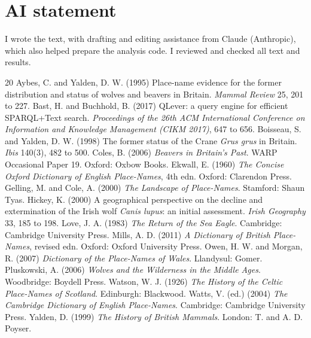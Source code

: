 \documentclass[11pt,a4paper]{article}
\begin{document}
\section*{AI statement}
I wrote the text, with drafting and editing assistance from Claude (Anthropic), which also helped prepare the analysis code. I reviewed and checked all text and results.

\begin{thebibliography}{20}
 Aybes, C. and Yalden, D. W. (1995) Place-name evidence for the former distribution and status of wolves and beavers in Britain. \textit{Mammal Review} 25, 201 to 227.
 Bast, H. and Buchhold, B. (2017) QLever: a query engine for efficient SPARQL+Text search. \textit{Proceedings of the 26th ACM International Conference on Information and Knowledge Management (CIKM 2017)}, 647 to 656.
 Boisseau, S. and Yalden, D. W. (1998) The former status of the Crane \textit{Grus grus} in Britain. \textit{Ibis} 140(3), 482 to 500.
 Coles, B. (2006) \textit{Beavers in Britain's Past}. WARP Occasional Paper 19. Oxford: Oxbow Books.
 Ekwall, E. (1960) \textit{The Concise Oxford Dictionary of English Place-Names}, 4th edn. Oxford: Clarendon Press.
 Gelling, M. and Cole, A. (2000) \textit{The Landscape of Place-Names}. Stamford: Shaun Tyas.
 Hickey, K. (2000) A geographical perspective on the decline and extermination of the Irish wolf \textit{Canis lupus}: an initial assessment. \textit{Irish Geography} 33, 185 to 198.
 Love, J. A. (1983) \textit{The Return of the Sea Eagle}. Cambridge: Cambridge University Press.
 Mills, A. D. (2011) \textit{A Dictionary of British Place-Names}, revised edn. Oxford: Oxford University Press.
 Owen, H. W. and Morgan, R. (2007) \textit{Dictionary of the Place-Names of Wales}. Llandysul: Gomer.
 Pluskowski, A. (2006) \textit{Wolves and the Wilderness in the Middle Ages}. Woodbridge: Boydell Press.
 Watson, W. J. (1926) \textit{The History of the Celtic Place-Names of Scotland}. Edinburgh: Blackwood.
 Watts, V. (ed.) (2004) \textit{The Cambridge Dictionary of English Place-Names}. Cambridge: Cambridge University Press.
 Yalden, D. (1999) \textit{The History of British Mammals}. London: T. and A. D. Poyser.
\end{thebibliography}
\end{document}
